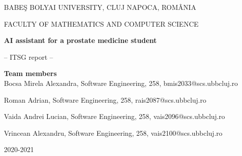 \documentclass[runningheads,a4paper,11pt]{report}
\begin{document}
\begin{titlepage}
\sloppy

\begin{center}
BABE\c S BOLYAI UNIVERSITY, CLUJ NAPOCA, ROM\^ ANIA

FACULTY OF MATHEMATICS AND COMPUTER SCIENCE

\vspace{6cm}

\Huge \textbf{AI assistant for a prostate medicine student}

\vspace{1cm}

\normalsize -- ITSG report --

\end{center}


\vspace{5cm}

\begin{flushright}
\Large{\textbf{Team members}}\\
Bocsa Mirela Alexandra, Software Engineering, 258, bmis2033@scs.ubbcluj.ro

Roman Adrian, Software Engineering, 258, rais2087@scs.ubbcluj.ro

Vaida Andrei Lucian, Software Engineering, 258, vais2096@scs.ubbcluj.ro

Vrincean Alexandru, Software Engineering, 258, vais2100@scs.ubbcluj.ro
\end{flushright}

\vspace{2cm}

\begin{center}
2020-2021
\end{center}

\end{titlepage}

\end{document}
